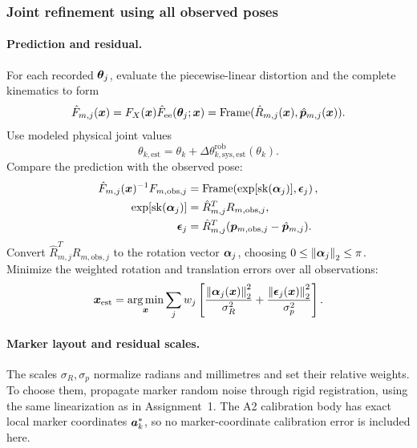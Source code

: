 \documentclass[../main.tex]{subfiles}
\begin{document}
\subsubsection{Joint refinement using all observed poses}\label{sec:math-pose-fit}
\paragraph{Prediction and residual.}
For each recorded $\bm{\theta}_j$, evaluate the piecewise-linear distortion and the complete kinematics to form
\begin{equation*}
\hat F_{m,j}(\bm{x})=F_X(\bm{x})\hat F_{\mathrm{ee}}(\bm{\theta}_j;\bm{x})
=\operatorname{Frame}(\hat R_{m,j}(\bm{x}),\hat{\bm{p}}_{m,j}(\bm{x})).
\end{equation*}
Use modeled physical joint values
\begin{equation*}
\theta_{k,\mathrm{est}}=\theta_k+\Delta\theta^{\mathrm{rob}}_{k,\mathrm{sys},\mathrm{est}}(\theta_k).
\end{equation*}
Compare the prediction with the observed pose:
\begin{equation}\label{eq:residual}
\begin{aligned}
\hat F_{m,j}(\bm{x})^{-1}F_{m,\mathrm{obs},j}
&=\operatorname{Frame}\!\left(\exp[\operatorname{sk}(\bm{\alpha}_j)],\bm{\epsilon}_j\right),\\
\exp[\operatorname{sk}(\bm{\alpha}_j)]&=\hat R_{m,j}^TR_{m,\mathrm{obs},j},\\
\bm{\epsilon}_j&=\hat R_{m,j}^T(\bm{p}_{m,\mathrm{obs},j}-\hat{\bm{p}}_{m,j}).
\end{aligned}
\end{equation}
Convert $\hat R_{m,j}^TR_{m,\mathrm{obs},j}$ to the rotation vector $\bm{\alpha}_j$, choosing $0\leq\left\|\bm{\alpha}_j\right\|_2\leq\pi$. Minimize the weighted rotation and translation errors over all observations:
\begin{equation}\label{eq:lsq}
\bm{x}_{\mathrm{est}}=\underset{\bm{x}}{\arg\min}
\sum_j w_j\left[
\frac{\left\|\bm{\alpha}_j(\bm{x})\right\|_2^2}{\sigma_R^2}
+\frac{\left\|\bm{\epsilon}_j(\bm{x})\right\|_2^2}{\sigma_p^2}
\right].
\end{equation}
\paragraph{Marker layout and residual scales.}
The scales $\sigma_R,\sigma_p$ normalize radians and millimetres and set their relative weights. To choose them, propagate marker random noise through rigid registration, using the same linearization as in Assignment~1. The A2 calibration body has exact local marker coordinates $\bm{a}_k^*$, so no marker-coordinate calibration error is included here.
\end{document}
